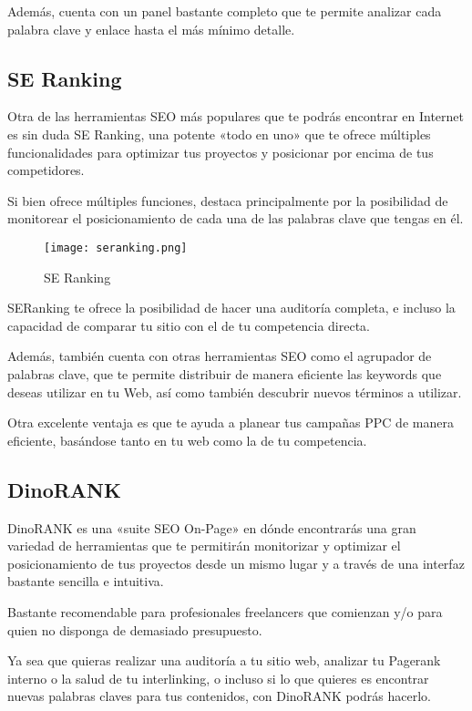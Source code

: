 Además, cuenta con un panel bastante completo que te permite analizar cada palabra clave y enlace hasta el más mínimo detalle.

\subsection{SE Ranking}

Otra de las herramientas SEO más populares que te podrás encontrar en Internet es sin duda SE Ranking, una potente «todo en uno» que te ofrece múltiples funcionalidades para optimizar tus proyectos y posicionar por encima de tus competidores.

Si bien ofrece múltiples funciones, destaca principalmente por la posibilidad de monitorear el posicionamiento de cada una de las palabras clave que tengas en él.

\begin{figure}[ht!]
    \texttt{[image: seranking.png]}
    \caption{SE Ranking}
    \label{image-semrush}
\end{figure}

SERanking te ofrece la posibilidad de hacer una auditoría completa, e incluso la capacidad de comparar tu sitio con el de tu competencia directa.

Además, también cuenta con otras herramientas SEO como el agrupador de palabras clave, que te permite distribuir de manera eficiente las keywords que deseas utilizar en tu Web, así como también descubrir nuevos términos a utilizar.

Otra excelente ventaja es que te ayuda a planear tus campañas PPC de manera eficiente, basándose tanto en tu web como la de tu competencia.

\subsection{DinoRANK}

DinoRANK es una «suite SEO On-Page» en dónde encontrarás una gran variedad de herramientas que te permitirán monitorizar y optimizar el posicionamiento de tus proyectos desde un mismo lugar y a través de una interfaz bastante sencilla e intuitiva.

Bastante recomendable para profesionales freelancers que comienzan y/o para quien no disponga de demasiado presupuesto.

Ya sea que quieras realizar una auditoría a tu sitio web, analizar tu Pagerank interno o la salud de tu interlinking, o incluso si lo que quieres es encontrar nuevas palabras claves para tus contenidos, con DinoRANK podrás hacerlo.

